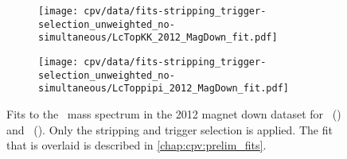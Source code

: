 \begin{table}
  \centering
  \caption{%
    Integrated luminosity for each data sample used in the analysis.
  }
  \label{tab:cpv:data:luminosity}
  
\end{table}

\begin{figure}
  \begin{subfigure}[b]{0.5\textwidth}
    \texttt{[image: cpv/data/fits-stripping\_trigger-selection\_unweighted\_no-simultaneous/LcTopKK\_2012\_MagDown\_fit.pdf]}
    \caption{\pKK}
    \label{fig:cpv:data:mass:pKK}
  \end{subfigure}
  \begin{subfigure}[b]{0.5\textwidth}
    \texttt{[image: cpv/data/fits-stripping\_trigger-selection\_unweighted\_no-simultaneous/LcToppipi\_2012\_MagDown\_fit.pdf]}
    \caption{\ppipi}
    \label{fig:cpv:data:mass:ppipi}
  \end{subfigure}
  \caption{%
    Fits to the \PLambdac\ mass spectrum in the 2012 magnet down dataset for 
    \pKK\ () and \ppipi\ 
    ().
    Only the stripping and trigger selection is applied.
    The fit that is overlaid is described in \cref{chap:cpv:prelim_fits}.
  }
  \label{fig:cpv:data:mass}
\end{figure}
